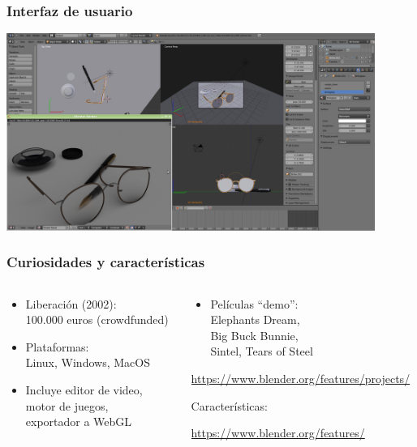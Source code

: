 \begin{frame}
\frametitle{Interfaz de usuario}

\includegraphics[width=12cm]{figs/blender-desktop}

\end{frame}

\begin{frame}
\frametitle{Curiosidades y características}

\begin{columns}[T]
\begin{column}{.46\textwidth}
  {\Large
    \begin{itemize}
    \item Liberación (2002): \\
      100.000 euros (crowdfunded) \\
    \item Plataformas: \\
      Linux, Windows, MacOS \\
    \item Incluye editor de video, \\
      motor de juegos, \\
      exportador a WebGL \\
    \end{itemize}
  }
\end{column}%
\hfill%
\begin{column}{.46\textwidth}
  {\Large
    \begin{itemize}
    \item Películas ``demo'': \\
      Elephants Dream, \\
      Big Buck Bunnie, \\
      Sintel, Tears of Steel \\
    \end{itemize}
  }
  \begin{flushright}
    \url{https://www.blender.org/features/projects/}
  \end{flushright}

  {\Large
    \vspace{.3cm}
    Características:
  }
  \begin{flushright}
    \url{https://www.blender.org/features/}
  \end{flushright}
\end{column}%
\end{columns}

\end{frame}


